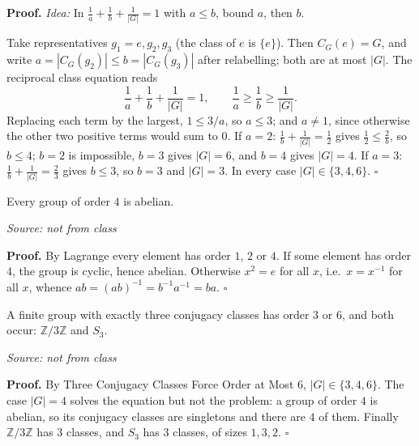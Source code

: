 \documentclass[11pt]{report}
\renewenvironment{proof}[1][Proof]{\noindent\textbf{#1.} }{\hfill$\square$\par\vspace{5pt}}
\newcommand{\srcline}[1]{\par\hfill{\footnotesize\textit{Source: #1}}}
\begin{document}
\begin{proof}
\textit{Idea:} In $\frac{1}{a} + \frac{1}{b} + \frac{1}{|G|} = 1$ with $a \leq b$, bound $a$, then $b$.\par
Take representatives $g_1 = e, g_2, g_3$ (the class of $e$ is $\{e\}$). Then $C_G(e) = G$, and write $a = |C_G(g_2)| \leq b = |C_G(g_3)|$ after relabelling; both are at most $|G|$. The reciprocal class equation reads
\[ \frac{1}{a} + \frac{1}{b} + \frac{1}{|G|} = 1, \qquad \frac{1}{a} \geq \frac{1}{b} \geq \frac{1}{|G|}. \]
Replacing each term by the largest, $1 \leq 3/a$, so $a \leq 3$; and $a \neq 1$, since otherwise the other two positive terms would sum to $0$. If $a = 2$: $\frac{1}{b} + \frac{1}{|G|} = \frac{1}{2}$ gives $\frac{1}{2} \leq \frac{2}{b}$, so $b \leq 4$; $b = 2$ is impossible, $b = 3$ gives $|G| = 6$, and $b = 4$ gives $|G| = 4$. If $a = 3$: $\frac{1}{b} + \frac{1}{|G|} = \frac{2}{3}$ gives $b \leq 3$, so $b = 3$ and $|G| = 3$. In every case $|G| \in \{3, 4, 6\}$.
\end{proof}

\begin{propbox}\label{prop:groups-order-4-abelian}
Every group of order $4$ is abelian.
\srcline{not from class}
\end{propbox}

\begin{proof}
By Lagrange every element has order $1$, $2$ or $4$. If some element has order $4$, the group is cyclic, hence abelian. Otherwise $x^2 = e$ for all $x$, i.e.\ $x = x^{-1}$ for all $x$, whence $ab = (ab)^{-1} = b^{-1}a^{-1} = ba$.
\end{proof}

\begin{corbox}\label{cor:exactly-three-conjugacy-classes-order-3-or-6}
A finite group with exactly three conjugacy classes has order $3$ or $6$, and both occur: $\mathbb{Z}/3\mathbb{Z}$ and $S_3$.
\srcline{not from class}
\end{corbox}

\begin{proof}
By Three Conjugacy Classes Force Order at Most $6$, $|G| \in \{3, 4, 6\}$. The case $|G| = 4$ solves the equation but not the problem: a group of order $4$ is abelian, so its conjugacy classes are singletons and there are $4$ of them. Finally $\mathbb{Z}/3\mathbb{Z}$ has $3$ classes, and $S_3$ has $3$ classes, of sizes $1, 3, 2$.
\end{proof}
\end{document}
